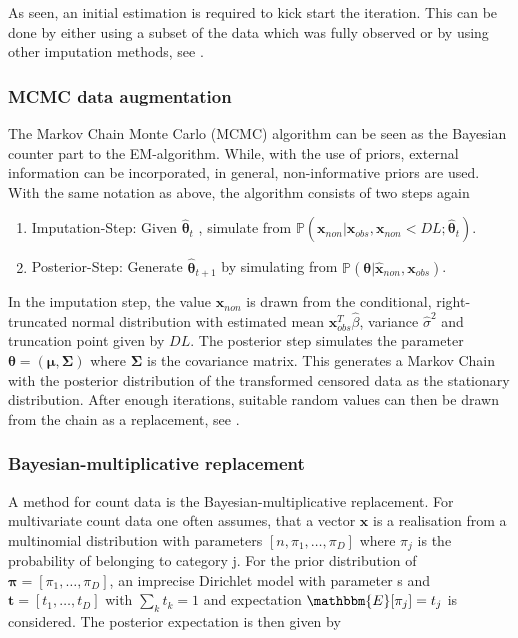 As seen, an initial estimation is required to kick start the iteration. This can be done by either using a subset of the data which was fully observed or by using other imputation methods, see \textcite{Palarea-Albaladejo:2015}. 


\subsubsection{MCMC data augmentation}
\label{sec:MCMC data augmentation}

The Markov Chain Monte Carlo (MCMC) algorithm can be seen as the Bayesian counter part to the EM-algorithm. While, with the use of priors, external information can be incorporated, in general, non-informative priors are used. With the same notation as above, the algorithm consists of two steps again

\begin{enumerate}
	\item Imputation-Step: Given $\hat{\bm{\theta}}_t$ , simulate from $\mathbb{P}(\bm{x}_{non}|\bm{x}_{obs},\bm{x}_{non} < DL; \hat{\bm{\theta}}_t)$.
	\item Posterior-Step: Generate $\hat{\bm{\theta}}_{t+1}$ by simulating from $\mathbb{P}(\bm{\theta}|\hat{\bm{x}}_{non},\bm{x}_{obs})$. 
\end{enumerate}
%
In the imputation step, the value $\hat{\bm{x}}_{non}$ is drawn from the conditional, right-truncated normal distribution with estimated mean $\bm{x}_{obs}^T\hat{\beta}$, variance $\hat{\sigma}^2$ and truncation point given by $DL$. The posterior step simulates the parameter $\bm{\theta}=(\bm{\mu},\bm{\Sigma})$ where $\bm{\Sigma}$ is the covariance matrix. This generates a Markov Chain with the posterior distribution of the transformed censored data as the stationary distribution. After enough iterations, suitable random values can then be drawn from the chain as a replacement, see \textcite{Palarea-Albaladejo:2015}. %


\subsubsection{Bayesian-multiplicative replacement}
\label{sec:Bayesian-multiplicative replacement}

A method for count data is the Bayesian-multiplicative replacement. For multivariate count data one often assumes, that a vector $\bm{x}$ is a realisation from a multinomial distribution with parameters $[n,\pi_1,\ldots,\pi_D]$ where $\pi_j$ is the probability of belonging to category j. For the prior distribution of $\bm{\pi}=[\pi_1,\ldots,\pi_D]$, an imprecise Dirichlet model with parameter s and $\bm{t}=[t_1,\ldots,t_D]$ with $\sum_k t_k=1$ and expectation $\mathbbm{E}[\pi_j]=t_j$ is considered. The posterior expectation is then given by 


